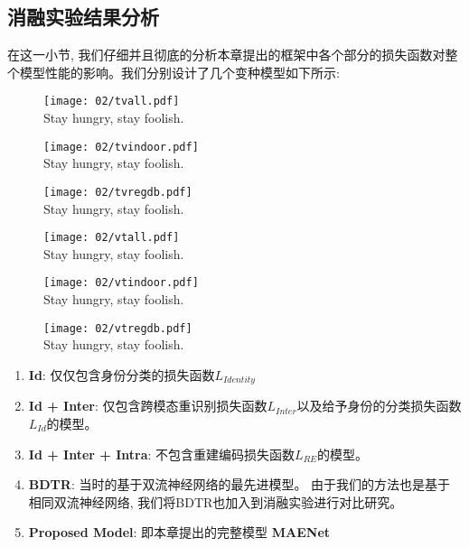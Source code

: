 \subsection{消融实验结果分析}
在这一小节, 我们仔细并且彻底的分析本章提出的框架中各个部分的损失函数对整个模型性能的影响。我们分别设计了几个变种模型如下所示:

\begin{figure}[!htp]
  \centering
  \texttt{[image: 02/tvall.pdf]} \\
    {Stay hungry, stay foolish.}
 \label{fig:tvall}
\end{figure}

\begin{figure}[!htp]
  \centering
  \texttt{[image: 02/tvindoor.pdf]} \\
  \bicaption[出现在插图索引中]
    {}
    {Stay hungry, stay foolish.}
 \label{fig:tvindoor}
\end{figure}

\begin{figure}[!htp]
  \centering
  \texttt{[image: 02/tvregdb.pdf]} \\
  \bicaption[出现在插图索引中]
    {}
    {Stay hungry, stay foolish.}
 \label{fig:tvregdb}
\end{figure}

\begin{figure}[!htp]
  \centering
  \texttt{[image: 02/vtall.pdf]} \\
  \bicaption[出现在插图索引中]
    {}
    {Stay hungry, stay foolish.}
 \label{fig:vtall}
\end{figure}

\begin{figure}[!htp]
  \centering
  \texttt{[image: 02/vtindoor.pdf]} \\
  \bicaption[出现在插图索引中]
    {}
    {Stay hungry, stay foolish.}
 \label{fig:vtindoor}
\end{figure}

\begin{figure}[!htp]
  \centering
  \texttt{[image: 02/vtregdb.pdf]} \\
  \bicaption[出现在插图索引中]
    {}
    {Stay hungry, stay foolish.}
 \label{fig:vtregdb}
\end{figure}

\begin{enumerate}
  \item \textbf{Id}: 仅仅包含身份分类的损失函数$L_{Identity}$
  \item \textbf{Id + Inter}: 仅包含跨模态重识别损失函数$L_{Inter}$以及给予身份的分类损失函数$L_{Id} $的模型。
  \item \textbf{Id + Inter + Intra}: 不包含重建编码损失函数$L_{RE}$的模型。
  \item \textbf{BDTR}: 当时的基于双流神经网络的最先进模型。 由于我们的方法也是基于相同双流神经网络, 我们将BDTR也加入到消融实验进行对比研究。
  \item \textbf{Proposed Model}: 即本章提出的完整模型 \textbf{MAENet}
\end{enumerate}

